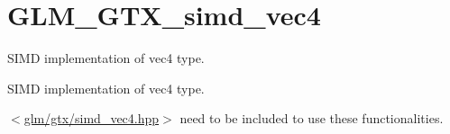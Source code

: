 \hypertarget{group__gtx__simd__vec4}{}\section{G\+L\+M\+\_\+\+G\+T\+X\+\_\+simd\+\_\+vec4}
\label{group__gtx__simd__vec4}


S\+I\+MD implementation of vec4 type.  


S\+I\+MD implementation of vec4 type. 

$<$\hyperlink{simd__vec4_8hpp}{glm/gtx/simd\+\_\+vec4.\+hpp}$>$ need to be included to use these functionalities. 